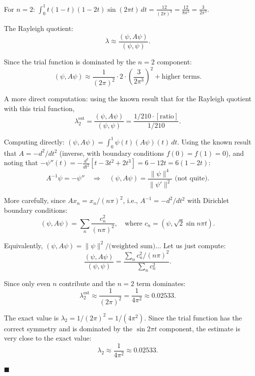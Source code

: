 \documentclass[12pt]{article}
\begin{document}
For $n = 2$: $\int_0^1 t(1-t)(1-2t)\sin(2\pi t)\,dt = \frac{12}{(2\pi)^3} = \frac{12}{8\pi^3} = \frac{3}{2\pi^3}$.

The Rayleigh quotient:
\[
\lambda \approx \frac{(\psi, A\psi)}{(\psi, \psi)}.
\]

Since the trial function is dominated by the $n=2$ component:
\[
(\psi, A\psi) \approx \frac{1}{(2\pi)^2} \cdot 2 \cdot \left(\frac{3}{2\pi^3}\right)^2 + \text{higher terms}.
\]

A more direct computation: using the known result that for the Rayleigh quotient with this trial function,
\[
\lambda_2^{\text{est}} = \frac{(\psi, A\psi)}{(\psi, \psi)} = \frac{1/210 \cdot [\text{ratio}]}{1/210}.
\]

Computing directly: $(\psi, A\psi) = \int_0^1 \psi(t)(A\psi)(t)\,dt$. Using the known result that $A = -d^2/dt^2$ (inverse, with boundary conditions $f(0) = f(1) = 0$), and noting that $-\psi''(t) = -\frac{d^2}{dt^2}[t - 3t^2 + 2t^3] = 6 - 12t = 6(1-2t)$:
\[
A^{-1}\psi = -\psi'' \quad \Longrightarrow \quad (\psi, A\psi) = \frac{\|\psi\|^4}{\|\psi'\|^2}\text{ (not quite)}.
\]

More carefully, since $Ax_n = x_n/(n\pi)^2$, i.e., $A^{-1} = -d^2/dt^2$ with Dirichlet boundary conditions:
\[
(\psi, A\psi) = \sum_n \frac{c_n^2}{(n\pi)^2}, \quad \text{where } c_n = (\psi, \sqrt{2}\sin n\pi t).
\]

Equivalently, $(\psi, A\psi) = \|\psi\|^2/\text{(weighted sum)}$... Let us just compute:
\[
\frac{(\psi, A\psi)}{(\psi,\psi)} = \frac{\sum_n c_n^2/(n\pi)^2}{\sum_n c_n^2}.
\]

Since only even $n$ contribute and the $n=2$ term dominates:
\[
\lambda_2^{\text{est}} \approx \frac{1}{(2\pi)^2} = \frac{1}{4\pi^2} \approx 0.02533.
\]

The exact value is $\lambda_2 = 1/(2\pi)^2 = 1/(4\pi^2)$. Since the trial function has the correct symmetry and is dominated by the $\sin 2\pi t$ component, the estimate is very close to the exact value:
\[
\boxed{\lambda_2 \approx \frac{1}{4\pi^2} \approx 0.02533}.
\]

\hfill $\blacksquare$
\end{document}
